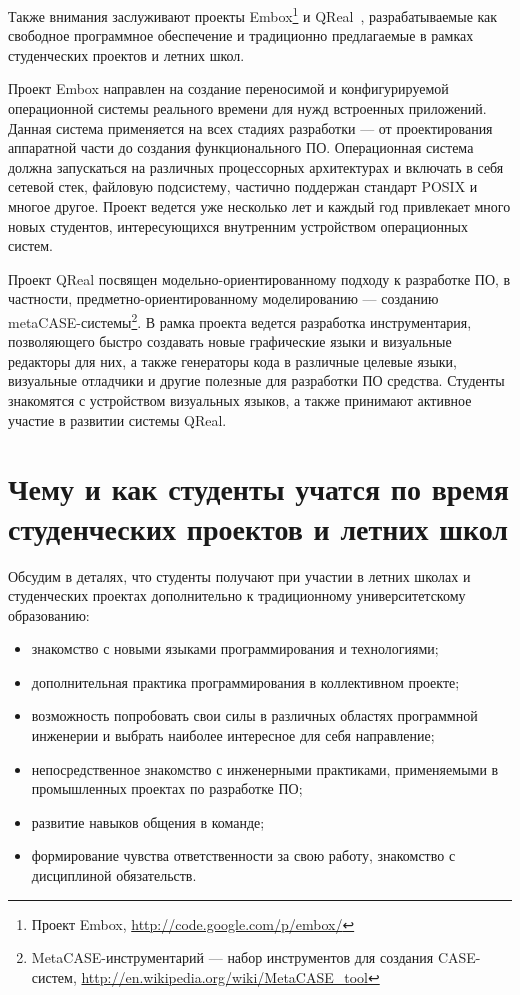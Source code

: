 \documentclass[a4paper]{article}
\begin{document}
Также внимания заслуживают проекты Embox\footnote{Проект Embox, \url{ http://code.google.com/p/embox/}} и QReal~\cite{qreal2, qreal3, qreal}, разрабатываемые как свободное программное обеспечение и традиционно предлагаемые в рамках студенческих проектов и летних школ. 

Проект Embox направлен на создание переносимой  и конфигурируемой операционной системы реального времени для нужд встроенных приложений. Данная система применяется на всех стадиях разработки --- от проектирования аппаратной части до создания функционального ПО. Операционная система  должна запускаться на различных процессорных архитектурах и включать в себя сетевой стек, файловую подсистему, частично поддержан стандарт POSIX и многое другое. Проект ведется уже несколько лет и каждый год привлекает много новых студентов, интересующихся внутренним устройством операционных систем.  

Проект QReal посвящен модельно-ориентированному подходу к разработке ПО, в частности, предметно-ориентированному моделированию --- созданию metaCASE-системы\footnote{MetaCASE-инструментарий --- набор инструментов для создания CASE-систем, \url{http://en.wikipedia.org/wiki/MetaCASE_tool}}. В рамка проекта ведется разработка инструментария, позволяющего быстро создавать новые графические языки и визуальные редакторы для них, а также генераторы кода в различные целевые языки, визуальные отладчики и другие полезные для разработки ПО средства. Студенты знакомятся с устройством визуальных языков, а также принимают активное участие в развитии системы QReal.

\section{Чему и как студенты учатся по время студенческих проектов и летних школ}

Обсудим в деталях, что студенты получают при участии в летних школах и студенческих проектах дополнительно к традиционному университетскому образованию:

\begin{itemize}
 \item знакомство с новыми языками программирования и технологиями;
 \item дополнительная практика программирования в коллективном проекте;
 \item возможность попробовать свои силы в различных областях программной инженерии и выбрать наиболее интересное для себя направление;
 \item непосредственное знакомство с инженерными практиками, применяемыми в промышленных проектах по разработке ПО;
 \item развитие навыков общения в команде;
 \item формирование чувства ответственности за свою работу, знакомство с дисциплиной обязательств.
\end{itemize}
\end{document}
